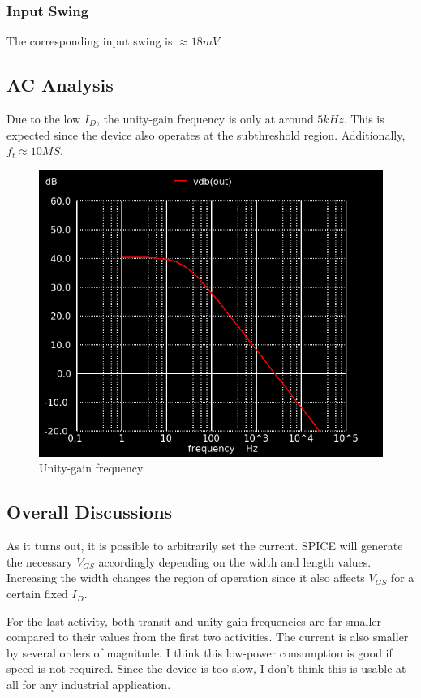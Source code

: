 \documentclass[conference]{IEEEtran}
\begin{document}
\subsubsection{Input Swing} 
The corresponding input swing is $\approx 18mV$

\subsection{AC Analysis}
Due to the low $I_D$, the unity-gain frequency is only at around $5kHz$. This is expected since the device also operates at the subthreshold region. Additionally, $f_t \approx 10MS$. 
\begin{figure}[H]
	\centering 
	\includegraphics[scale=0.4]{vdb3.png}
	\caption{Unity-gain frequency}
	\label{vdb3}	
\end{figure} 

\subsection{Overall Discussions}
As it turns out, it is possible to arbitrarily set the current. SPICE will generate the necessary $V_{GS}$ accordingly depending on the width and length values. Increasing the width changes the region of operation since it also affects $V_{GS}$ for a certain fixed $I_D$. 

\vspace{8pt}
For the last activity, both transit and unity-gain frequencies are far smaller compared to their values from the first two activities. The current is also smaller by several orders of magnitude. I think this low-power consumption is good if speed is not required. Since the device is too slow, I don't think this is usable at all for any industrial application. 
\end{document}
